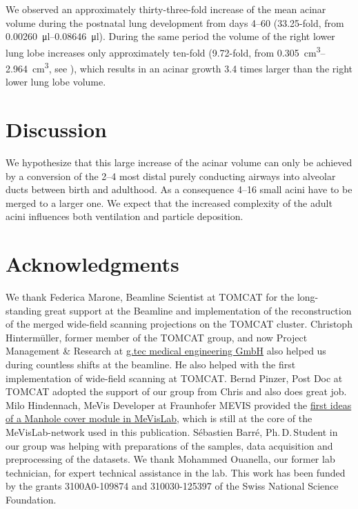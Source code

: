 \documentclass[%
	paper=a4,%
	twoside=true,%
	draft=false,%
	abstract=false]{scrartcl}
\begin{document}
We observed an approximately thirty-three-fold increase of the mean acinar volume during the postnatal lung development from days \numrange{4}{60} (33.25-fold, from \SIrange{0.00260}{0.08646}{\micro\litre}). During the same period the volume of the right lower lung lobe increases only approximately ten-fold (9.72-fold, from \SIrange{0.305}{2.964}{\centi\metre\cubed}, see \cite{Tschanz2003}), which results in an acinar growth 3.4 times larger than the right lower lung lobe volume.

\section{Discussion}\label{sec:Discussion}
We hypothesize that this large increase of the acinar volume can only be achieved by a conversion of the \numrange{2}{4} most distal purely conducting airways into alveolar ducts between birth and adulthood. As a consequence \numrange{4}{16} small acini have to be merged to a larger one. We expect that the increased complexity of the adult acini influences both ventilation and particle deposition.

\section{Acknowledgments}
We thank Federica Marone, Beamline Scientist at TOMCAT for the long-standing great support at the Beamline and implementation of the reconstruction of the merged wide-field scanning projections on the TOMCAT cluster. Christoph Hinterm\"{u}ller, former member of the TOMCAT group, and now Project Management \& Research at \href{http://gtec.at/}{g.tec medical engineering GmbH} also helped us during countless shifts at the beamline. He also helped with the first implementation of wide-field scanning at TOMCAT. Bernd Pinzer, Post Doc at TOMCAT adopted the support of our group from Chris and also does great job. Milo Hindennach, MeVis Developer at Fraunhofer MEVIS provided the \href{http://www.mevis-research.de/cgi-bin/discus/board-auth.cgi?lm=1282233250&file=/839/11760.html}{first ideas of a Manhole cover module in MeVisLab}, which is still at the core of the MeVisLab-network used in this publication. Sébastien Barré, Ph.\,D.\,Student in our group was helping with preparations of the samples, data acquisition and preprocessing of the datasets. We thank Mohammed Ouanella, our former lab technician, for expert technical assistance in the lab. This work has been funded by the grants 3100A0-109874 and 310030-125397  of the Swiss National Science Foundation.



 
\end{document}

